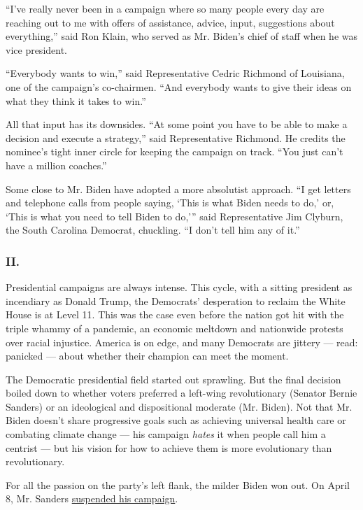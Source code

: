 ``I've really never been in a campaign where so many people every day
are reaching out to me with offers of assistance, advice, input,
suggestions about everything,'' said Ron Klain, who served as Mr.
Biden's chief of staff when he was vice president.

``Everybody wants to win,'' said Representative Cedric Richmond of
Louisiana, one of the campaign's co-chairmen. ``And everybody wants to
give their ideas on what they think it takes to win.''

All that input has its downsides. ``At some point you have to be able to
make a decision and execute a strategy,'' said Representative Richmond.
He credits the nominee's tight inner circle for keeping the campaign on
track. ``You just can't have a million coaches.''

Some close to Mr. Biden have adopted a more absolutist approach. ``I get
letters and telephone calls from people saying, `This is what Biden
needs to do,' or, `This is what you need to tell Biden to do,''' said
Representative Jim Clyburn, the South Carolina Democrat, chuckling. ``I
don't tell him any of it.''

\hypertarget{ii}{%
\subsubsection{II.}\label{ii}}

Presidential campaigns are always intense. This cycle, with a sitting
president as incendiary as Donald Trump, the Democrats' desperation to
reclaim the White House is at Level 11. This was the case even before
the nation got hit with the triple whammy of a pandemic, an economic
meltdown and nationwide protests over racial injustice. America is on
edge, and many Democrats are jittery --- read: panicked --- about
whether their champion can meet the moment.

The Democratic presidential field started out sprawling. But the final
decision boiled down to whether voters preferred a left-wing
revolutionary (Senator Bernie Sanders) or an ideological and
dispositional moderate (Mr. Biden). Not that Mr. Biden doesn't share
progressive goals such as achieving universal health care or combating
climate change --- his campaign \emph{hates} it when people call him a
centrist --- but his vision for how to achieve them is more evolutionary
than revolutionary.

For all the passion on the party's left flank, the milder Biden won out.
On April 8, Mr. Sanders
\href{https://www.nytimes3xbfgragh.onion/2020/04/08/us/politics/bernie-sanders-drops-out.html}{suspended
his campaign}.

